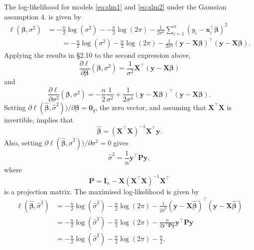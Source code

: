 \documentclass[]{book}
\theoremstyle{definition}
\theoremstyle{definition}
\theoremstyle{definition}
\theoremstyle{remark}
\begin{document}
The log-likelihood for models \eqref{eq:slm1} and \eqref{eq:slm2} under the Gaussian assumption 4. is given by
\begin{align*}
\ell({\pmb \beta}, \sigma^2)&=-\frac{n}{2}\log (\sigma^2)--\frac{n}{2}\log(2\pi)-\frac{1}{2\sigma^2} \sum_{i=1}^n (y_i-\boldsymbol x_i^\top {\pmb \beta})^2\\
& \qquad = -\frac{n}{2}\log (\sigma^2)-\frac{n}{2}\log(2\pi)-\frac{1}{2\sigma^2} (\boldsymbol y- \boldsymbol X{\pmb \beta})^\top (\boldsymbol y- \boldsymbol X{\pmb \beta}).
\end{align*}
Applying the results in \S 2.10 to the second expression above,
\[
\frac{\partial \ell}{\partial {\pmb \beta}}({\pmb \beta}, \sigma^2)=\frac{1}{\sigma^2}\boldsymbol X^\top (\boldsymbol y- \boldsymbol X{\pmb \beta})
\]
and
\[
\frac{\partial \ell}{\partial \sigma^2}({\pmb \beta}, \sigma^2)=-\frac{n}{2}\frac{1}{\sigma^2}+\frac{1}{2\sigma^4}
 (\boldsymbol y- \boldsymbol X{\pmb \beta})^\top (\boldsymbol y- \boldsymbol X{\pmb \beta}).
\]
Setting \(\partial \ell(\hat{\pmb \beta}, \hat{\sigma}^2))/\partial {\pmb \beta}={\mathbf 0}_q\), the zero vector, and assuming that \(\boldsymbol X^\top \boldsymbol X\) is invertible, implies that
\begin{equation}
\hat{\pmb \beta}=\left (\boldsymbol X^\top \boldsymbol X\right )^{-1}\boldsymbol X^\top \boldsymbol y.
\label{eq:uni1}
\end{equation}
Also, setting \(\partial \ell(\hat{\pmb \beta}, \hat{\sigma}^2))/\partial \sigma^2=0\) gives
\begin{equation}
\hat{\sigma}^2 = \frac{1}{n}\boldsymbol y^\top \boldsymbol P\boldsymbol y,
\label{eq:uni2}
\end{equation}
where
\begin{equation}
\boldsymbol P=\boldsymbol I_n - \boldsymbol X\left ( \boldsymbol X^\top \boldsymbol X\right)^{-1}\boldsymbol X^\top
\label{eq:defP}
\end{equation}
is a projection matrix. The maximised log-likelihood is given by
\begin{align*}
\ell(\hat{\pmb \beta}, \hat{\sigma}^2)&= -\frac{n}{2}\log(\hat{\sigma}^2)-\frac{n}{2}\log(2\pi) -\frac{1}{2\hat{\sigma}^2}(\boldsymbol y- \boldsymbol X\hat{\pmb \beta})^\top (\boldsymbol y- \boldsymbol X\hat{\pmb \beta})\\
&= -\frac{n}{2}\log(\hat{\sigma}^2)-\frac{n}{2}\log(2\pi)-\frac{n}{2\boldsymbol y^\top \boldsymbol P\boldsymbol y}\boldsymbol y^\top \boldsymbol P\boldsymbol y\\
&=-\frac{n}{2}\log(\hat{\sigma}^2)-\frac{n}{2}\log(2\pi)-\frac{n}{2}.
\end{align*}
\end{document}
